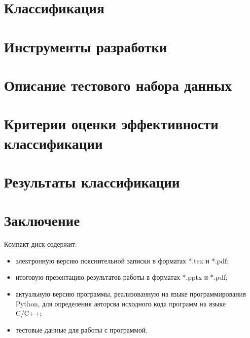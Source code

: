 \newpage  
\section{Классификация}\label{classifiers}


\newpage  
\section{Инструменты разработки}


% 


\newpage 
\section{Описание тестового набора данных}\label{test_data}


\section{Критерии оценки эффективности классификации}\label{eval}


\newpage 
\section{Результаты классификации}

 
 
 \newpage
\section*{Заключение}

 
 
 \newpage
 \renewcommand{\refname}{Список использованных источников}
 

 Компакт-диск содержит: 
 \begin{itemize}
 \item электронную версию пояснительной записки в форматах *.tex и *.pdf;
 \item итоговую презентацию результатов работы в форматах *.pptx и *.pdf;
 \item актуальную версию программы, реализованную на языке программирования Python, для определения авторсва исходного кода программ на языке C/C++;
 \item тестовые данные для работы с программой.
 \end{itemize}
 


